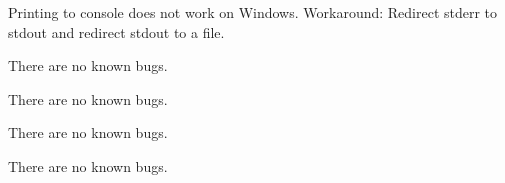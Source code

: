 
\begin{DoxyRefList}
\item[\label{bug__bug000001}%
\Hypertarget{bug__bug000001}%
File \hyperlink{debug_8h}{debug.h} ]Printing to console does not work on Windows. Workaround\+: Redirect stderr to stdout and redirect stdout to a file. 
\item[\label{bug__bug000002}%
\Hypertarget{bug__bug000002}%
File \hyperlink{defines_8h}{defines.h} ]There are no known bugs. 
\item[\label{bug__bug000003}%
\Hypertarget{bug__bug000003}%
Namespace \hyperlink{namespacehelper}{helper} ]There are no known bugs.  
\item[\label{bug__bug000004}%
\Hypertarget{bug__bug000004}%
Class \hyperlink{classMotor}{Motor} ]There are no known bugs. 
\item[\label{bug__bug000005}%
\Hypertarget{bug__bug000005}%
File \hyperlink{version_8h}{version.h} ]There are no known bugs.
\end{DoxyRefList}